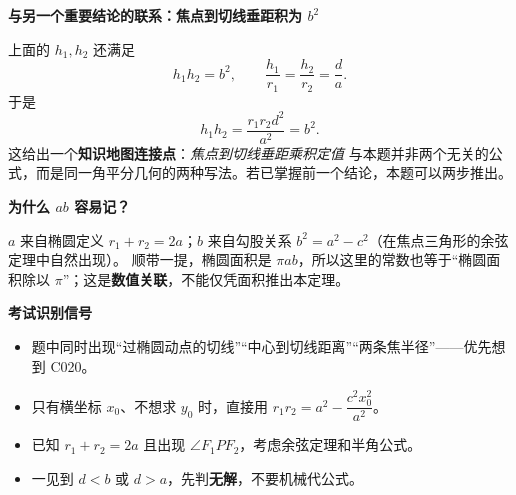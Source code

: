 \begin{explanationbox}
\medskip
\textbf{\textcolor{CExplanation}{与另一个重要结论的联系：焦点到切线垂距积为 $b^2$}}

上面的 $h_1,h_2$ 还满足
\[
\boxed{h_1h_2=b^2},\qquad
\frac{h_1}{r_1}=\frac{h_2}{r_2}=\frac{d}{a}.
\]
于是
\[
h_1h_2=\frac{r_1r_2d^2}{a^2}=b^2.
\]
这给出一个\textbf{知识地图连接点}：\emph{焦点到切线垂距乘积定值} 与本题并非两个无关的公式，而是同一角平分几何的两种写法。若已掌握前一个结论，本题可以两步推出。

\medskip
\textbf{\textcolor{CExplanation}{为什么 $ab$ 容易记？}}

$a$ 来自椭圆定义 $r_1+r_2=2a$；$b$ 来自勾股关系 $b^2=a^2-c^2$（在焦点三角形的余弦定理中自然出现）。
顺带一提，椭圆面积是 $\pi ab$，所以这里的常数也等于“椭圆面积除以 $\pi$”；这是\textbf{数值关联}，不能仅凭面积推出本定理。

\medskip
\textbf{\textcolor{CExplanation}{考试识别信号}}
\begin{itemize}[leftmargin=*,itemsep=0.3em]
 \item 题中同时出现“过椭圆动点的切线”“中心到切线距离”“两条焦半径”——优先想到 C020。
 \item 只有横坐标 $x_0$、不想求 $y_0$ 时，直接用 $r_1r_2=a^2-\dfrac{c^2x_0^2}{a^2}$。
 \item 已知 $r_1+r_2=2a$ 且出现 $\angle F_1PF_2$，考虑余弦定理和半角公式。
 \item 一见到 $d<b$ 或 $d>a$，先判\textbf{无解}，不要机械代公式。
\end{itemize}
\end{explanationbox}
